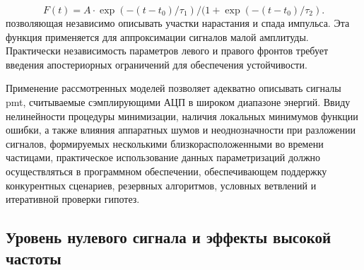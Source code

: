 \begin{itemize}
    \begin{equation}
        F(t) = A \cdot \exp(-(t-t_0)/\tau_1) /(1 + \exp(-(t-t_0)/\tau_2).
    \end{equation}
    позволяющая независимо описывать участки нарастания и спада
    импульса. Эта функция применяется для аппроксимации сигналов
    малой амплитуды. Практически независимость параметров левого и
    правого фронтов требует введения апостериорных ограничений для
    обеспечения устойчивости.
\end{itemize}

Применение рассмотренных моделей позволяет адекватно описывать сигналы
\acrshort{pmt}, считываемые сэмплирующими АЦП в широком диапазоне энергий.
Ввиду нелинейности процедуры минимизации, наличия локальных минимумов
функции ошибки, а также влияния аппаратных шумов и неоднозначности при
разложении сигналов, формируемых несколькими близкорасположенными
во времени частицами, практическое использование данных параметризаций
должно осуществляться в программном обеспечении, обеспечивающем
поддержку конкурентных сценариев, резервных алгоритмов, условных
ветвлений и итеративной проверки гипотез.

\subsection{Уровень нулевого сигнала и эффекты высокой частоты}

